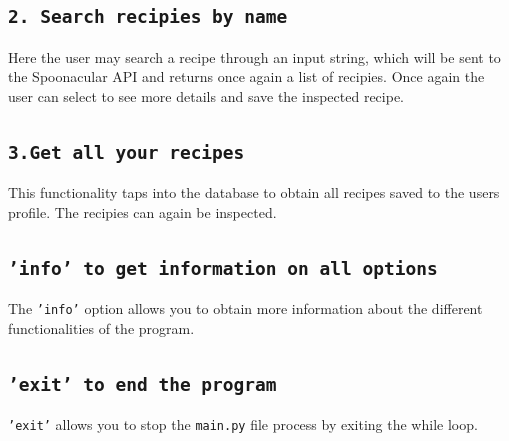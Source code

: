 \documentclass[11pt,a4paper,notitlepage]{article}
\begin{document}
 \subsection*{\texttt{2. Search recipies by name}}
 Here the user may search a recipe through an input string, which will be sent to the Spoonacular API and returns once again a list of recipies. Once again the user can select to see more details and save the inspected recipe.
 
 \subsection*{\texttt{3.Get all your recipes}}
 This functionality taps into the database to obtain all recipes saved to the users profile. The recipies can again be inspected.
  
\subsection*{\texttt{'info' to get information on all options}}
The \texttt{'info'} option allows you to obtain more information about the different functionalities of the program.
  
\subsection*{\texttt{'exit' to end the program}}
\texttt{'exit'} allows you to stop the \texttt{main.py} file process by exiting the while loop.
\end{document}
